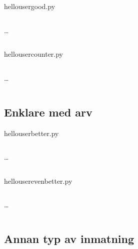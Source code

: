 \begin{frame}[fragile]
  hello\textunderscore user\textunderscore good.py \hrulefill
  \inputminted[autogobble=false,linenos,firstline=18,lastline=25]{python}{examples/hello_user_good.py}
  \dots
  \inputminted[autogobble=false,linenos,firstline=30,lastline=32]{python}{examples/hello_user_good.py}
\end{frame}

\begin{frame}[fragile]
  hello\textunderscore user\textunderscore counter.py \hrulefill
  \inputminted[linenos,firstline=5,lastline=14]{python}{examples/hello_user_counter.py}
  \dots
  \inputminted[autogobble=false,linenos,firstline=32,lastline=35]{python}{examples/hello_user_counter.py}
\end{frame}

\subsection{Enklare med arv}

\begin{frame}[fragile]
  hello\textunderscore user\textunderscore better.py \hrulefill
  \inputminted[linenos,firstline=5,lastline=13]{python}{examples/hello_user_better.py}
  \dots
  \inputminted[linenos,firstline=33,lastline=38]{python}{examples/hello_user_better.py}
\end{frame}

\begin{frame}[fragile]
  hello\textunderscore user\textunderscore even\textunderscore better.py
  \hrulefill
  \inputminted[linenos,firstline=5,lastline=9]{python}{examples/hello_user_even_better.py}
  \dots
  \inputminted[autogobble=false,linenos,firstline=24,lastline=32]{python}{examples/hello_user_even_better.py}
\end{frame}

\subsection{Annan typ av inmatning}

